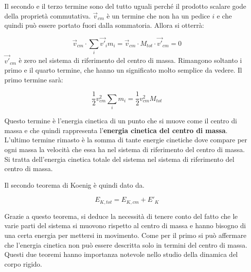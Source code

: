 Il secondo e il terzo termine sono del tutto uguali perché il prodotto scalare gode della proprietà commutativa. $\vec{v}_{cm}$ è un termine che non ha un pedice $i$ e che quindi può essere portato fuori dalla sommatoria. Allora si otterrà:

\[
	\vec{v}_{cm} \cdot \sum_i \vec{v'}_i m_i = \vec{v}_{cm}\cdot M_{tot}\cdot \vec{v'}_{cm} = 0
\]
$\vec{v'}_{cm}$ è zero nel sistema di riferimento del centro di massa.
Rimangono soltanto i primo e il quarto termine, che hanno un significato molto semplice da vedere. Il primo termine sarà:

\[
	\frac{1}{2} v_{cm}^2 \sum_i m_i = \frac{1}{2} v_{cm}^2 M_{tot}
\]

Questo termine è l'energia cinetica di un punto che si muove come il centro di massa e che quindi rappresenta l'\textbf{energia cinetica del centro di massa}.
L'ultimo termine rimasto è la somma di tante energie cinetiche dove compare per ogni massa la velocità che essa ha nel sistema di riferimento del centro di massa. Si tratta dell'energia cinetica totale del sistema nel sistema di riferimento del centro di massa.

Il secondo teorema di Koenig è quindi dato da.

\[
	\boxed{E_{K,tot} = E_{K,cm} + E'_K}
\]

Grazie a questo teorema, si deduce la necessità di tenere conto del fatto che le varie parti del sistema si muovono rispetto al centro di massa e hanno bisogno di una certa energia per mettersi in movimento.
Come per il primo si può affermare che l'energia cinetica non può essere descritta solo in termini del centro di massa.
Questi due teoremi hanno importanza notevole nello studio della dinamica del corpo rigido.

